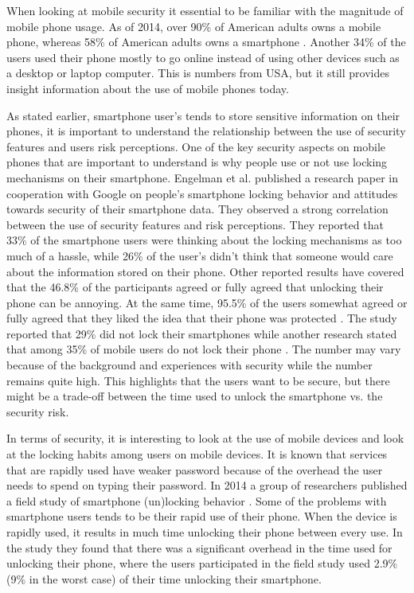   When looking at mobile security it essential to be familiar with the magnitude of mobile phone usage. As of 2014, over 90\% of American adults owns a mobile phone, whereas 58\% of American adults owns a smartphone \cite{MobileUseage}. Another 34\% of the users used their phone mostly to go online instead of using other devices such as a desktop or laptop computer. This is numbers from USA, but it still provides insight information about the use of mobile phones today.

  As stated earlier, smartphone user's tends to store sensitive information on their phones, it is important to understand the relationship between the use of security features and users risk perceptions. One of the key security aspects on mobile phones that are important to understand is why people use or not use locking mechanisms on their smartphone. Engelman et al. \cite{Egelman} published a research paper in cooperation with Google on people's smartphone locking behavior and attitudes towards security of their smartphone data. They observed a strong correlation between the use of security features and risk perceptions. They reported that 33\% of the smartphone users were thinking about the locking mechanisms as too much of a hassle, while 26\% of the user's didn't think that someone would care about the information stored on their phone. Other reported results have covered that the 46.8\% of the participants agreed or fully agreed that unlocking their phone can be annoying. At the same time, 95.5\% of the users somewhat agreed or fully agreed that they liked the idea that their phone was protected \cite{habits3}. The study reported that 29\% did not lock their smartphones \cite{MobileUseage} while another research stated that among 35\% of mobile users do not lock their phone \cite{Bruggen}. The number may vary because of the background and experiences with security while the number remains quite high. This highlights that the users want to be secure, but there might be a trade-off between the time used to unlock the smartphone vs. the security risk. 

  In terms of security, it is interesting to look at the use of mobile devices and look at the locking habits among users on mobile devices. It is known that services that are rapidly used have weaker password because of the overhead the user needs to spend on typing their password. In 2014 a group of researchers published a field study of smartphone (un)locking behavior \cite{habits3}. Some of the problems with smartphone users tends to be their rapid use of their phone. When the device is rapidly used, it results in much time unlocking their phone between every use. In the study they found that there was a significant overhead in the time used for unlocking their phone, where the users participated in the field study used 2.9\% (9\% in the worst case) of their time unlocking their smartphone.

